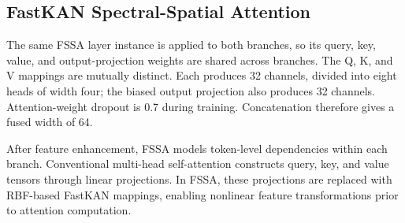 \documentclass{revision_assets/ieeeaccess_revision}
\newif\ifrevisionhighlights
\newenvironment{revision}{\ifrevisionhighlights\begin{shaded*}\fi}{\ifrevisionhighlights\end{shaded*}\fi}
\begin{document}
\subsection{FastKAN Spectral-Spatial Attention}
\begin{revision}
The same FSSA layer instance is applied to both branches, so its query, key, value, and output-projection weights are shared across branches. The Q, K, and V mappings are mutually distinct. Each produces 32 channels, divided into eight heads of width four; the biased output projection also produces 32 channels. Attention-weight dropout is 0.7 during training. Concatenation therefore gives a fused width of 64.
\end{revision}

\label{sec:fssa}

After feature enhancement, FSSA models token-level dependencies within each branch. Conventional multi-head self-attention constructs query, key, and value tensors through linear projections. In FSSA, these projections are replaced with RBF-based FastKAN mappings, enabling nonlinear feature transformations prior to attention computation.
\end{document}
